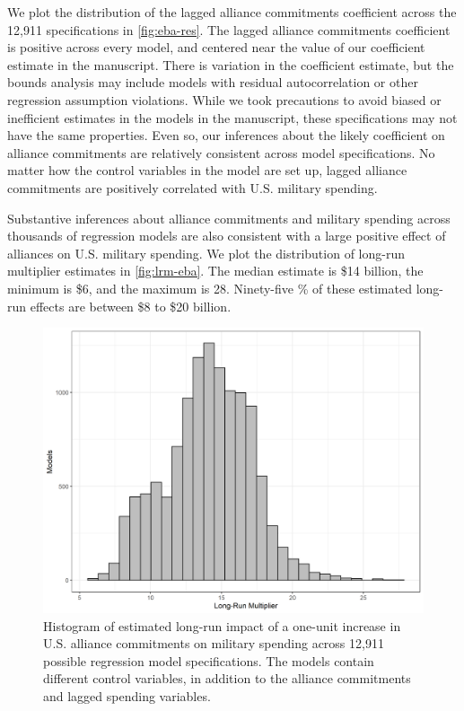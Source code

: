 \documentclass[12pt]{article}
\begin{document}
We plot the distribution of the lagged alliance commitments coefficient across the 12,911 specifications in \autoref{fig:eba-res}. 
The lagged alliance commitments coefficient is positive across every model, and centered near the value of our coefficient estimate in the manuscript. 
There is variation in the coefficient estimate, but the bounds analysis may include models with residual autocorrelation or other regression assumption violations. 
While we took precautions to avoid biased or inefficient estimates in the models in the manuscript, these specifications may not have the same properties.  
Even so, our inferences about the likely coefficient on alliance commitments are relatively consistent across model specifications. 
No matter how the control variables in the model are set up, lagged alliance commitments are positively correlated with U.S. military spending. 


Substantive inferences about alliance commitments and military spending across thousands of regression models are also consistent with a large positive effect of alliances on U.S. military spending.
We plot the distribution of long-run multiplier estimates in \autoref{fig:lrm-eba}. 
The median estimate is \$14 billion, the minimum is \$6, and the maximum is 28. 
Ninety-five \% of these estimated long-run effects are between \$8 to \$20 billion.  


\begin{figure} 
\includegraphics[width = .95\textwidth]{lrm-eba.png}
\caption{Histogram of estimated long-run impact of a one-unit increase in U.S. alliance commitments on military spending across 12,911 possible regression model specifications. 
The models contain different control variables, in addition to the alliance commitments and lagged spending variables.}
\label{fig:lrm-eba}
\end{figure}
\end{document}
